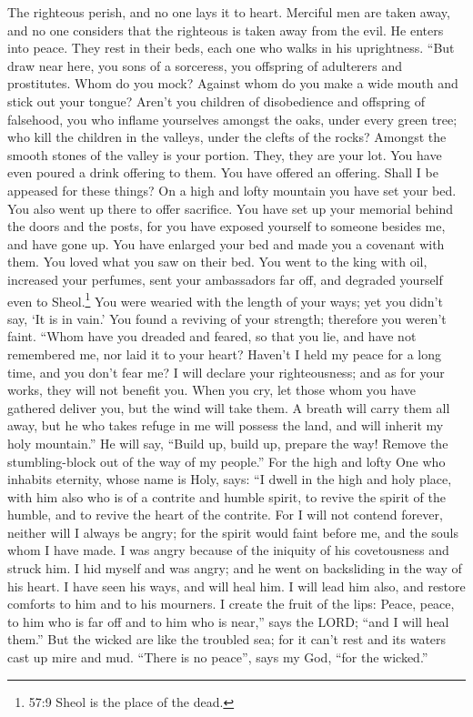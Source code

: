  The righteous perish, and no one lays it to heart. Merciful
men are taken away, and no one considers that the righteous is taken
away from the evil.  He enters into peace. They rest in
their beds, each one who walks in his uprightness.  ``But
draw near here, you sons of a sorceress, you offspring of adulterers and
prostitutes.  Whom do you mock? Against whom do you make a
wide mouth and stick out your tongue? Aren't you children of
disobedience and offspring of falsehood,  you who inflame
yourselves amongst the oaks, under every green tree; who kill the
children in the valleys, under the clefts of the rocks? 
Amongst the smooth stones of the valley is your portion. They, they are
your lot. You have even poured a drink offering to them. You have
offered an offering. Shall I be appeased for these things? 
On a high and lofty mountain you have set your bed. You also went up
there to offer sacrifice.  You have set up your memorial
behind the doors and the posts, for you have exposed yourself to someone
besides me, and have gone up. You have enlarged your bed and made you a
covenant with them. You loved what you saw on their bed. 
You went to the king with oil, increased your perfumes, sent your
ambassadors far off, and degraded yourself even to Sheol.\footnote{57:9
  Sheol is the place of the dead.}  You were wearied with
the length of your ways; yet you didn't say, `It is in vain.' You found
a reviving of your strength; therefore you weren't faint. 
``Whom have you dreaded and feared, so that you lie, and have not
remembered me, nor laid it to your heart? Haven't I held my peace for a
long time, and you don't fear me?  I will declare your
righteousness; and as for your works, they will not benefit you.
 When you cry, let those whom you have gathered deliver
you, but the wind will take them. A breath will carry them all away, but
he who takes refuge in me will possess the land, and will inherit my
holy mountain.''  He will say, ``Build up, build up,
prepare the way! Remove the stumbling-block out of the way of my
people.''  For the high and lofty One who inhabits
eternity, whose name is Holy, says: ``I dwell in the high and holy
place, with him also who is of a contrite and humble spirit, to revive
the spirit of the humble, and to revive the heart of the contrite.
 For I will not contend forever, neither will I always be
angry; for the spirit would faint before me, and the souls whom I have
made.  I was angry because of the iniquity of his
covetousness and struck him. I hid myself and was angry; and he went on
backsliding in the way of his heart.  I have seen his ways,
and will heal him. I will lead him also, and restore comforts to him and
to his mourners.  I create the fruit of the lips: Peace,
peace, to him who is far off and to him who is near,'' says the LORD;
``and I will heal them.''  But the wicked are like the
troubled sea; for it can't rest and its waters cast up mire and mud.
 ``There is no peace'', says my God, ``for the wicked.''


